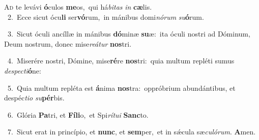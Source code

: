 \lettrine{\initial\textcolor{\initialcolor}{A}}{d} te levávi \textbf{ó}\-culos \textbf{me}\-os,~\star qui há\-\textit{bi}\-\textit{tas} \textit{in} \textbf{cæ}\-lis.\\
{\numbfont\textcolor{\numbcolor}{~2.}}~Ecce sicut ócu\textbf{li} ser\-\textbf{vó}\-rum,~\star in mánibus domi\-\textit{nó}\-\textit{rum} \textit{su}\-\textbf{ó}rum.\par
{\numbfont\textcolor{\numbcolor}{~3.}}~Sicut óculi ancíllæ in mánibus \textbf{dó}\-minæ \textbf{su}\-æ:~\star ita óculi nostri ad Dóminum, Deum nostrum, donec mise\-\textit{re}\-\textit{á}\textit{tur} \textbf{nos}\-tri.\par
{\numbfont\textcolor{\numbcolor}{~4.}}~Miserére nostri, Dómine, mise\-\textbf{ré}\-re \textbf{nos}\-tri:~\star quia multum repléti sumus \textit{de}\-\textit{spec}\textit{ti}\textbf{ó}ne:\par
{\numbfont\textcolor{\numbcolor}{~5.}}~Quia multum repléta est \textbf{á}\-nima \textbf{nos}\-tra:~\star oppróbrium abundántibus, et despéc\-\textit{ti}\-\textit{o} \textit{su}\-\textbf{pér}bis.\par
{\numbfont\textcolor{\numbcolor}{~6.}}~Glória \textbf{Pa}\-tri, et \textbf{Fí}\-\textbf{li}o,~\star et Spi\-\textit{rí}\-\textit{tu}\textit{i} \textbf{Sanc}\-to.\par
{\numbfont\textcolor{\numbcolor}{~7.}}~Sicut erat in princípio, et \textbf{nunc}\-, et \textbf{sem}\-per,~\star et in sǽcula sæ\-\textit{cu}\-\textit{ló}\textit{rum}. \textbf{A}\-men.\par
